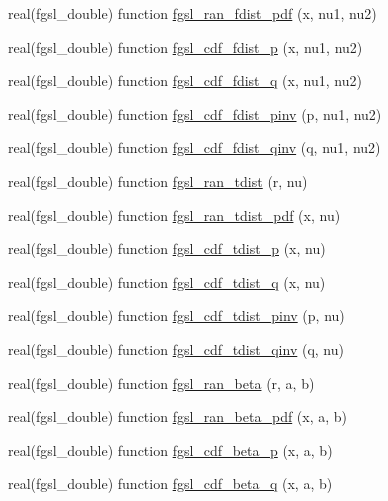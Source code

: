 \begin{DoxyCompactItemize}
\item 
real(fgsl\-\_\-double) function \hyperlink{rng_8finc_a752a7663a532c2765b796040098568e8}{fgsl\-\_\-ran\-\_\-fdist\-\_\-pdf} (x, nu1, nu2)
\item 
real(fgsl\-\_\-double) function \hyperlink{rng_8finc_a83d8d3cbe6899eadccd876c082e855b7}{fgsl\-\_\-cdf\-\_\-fdist\-\_\-p} (x, nu1, nu2)
\item 
real(fgsl\-\_\-double) function \hyperlink{rng_8finc_a8d5d5e89002d7fa3b09a8f0dcb223328}{fgsl\-\_\-cdf\-\_\-fdist\-\_\-q} (x, nu1, nu2)
\item 
real(fgsl\-\_\-double) function \hyperlink{rng_8finc_a5b0a774f2b2bfd4ff9a6b2bcba45e5b8}{fgsl\-\_\-cdf\-\_\-fdist\-\_\-pinv} (p, nu1, nu2)
\item 
real(fgsl\-\_\-double) function \hyperlink{rng_8finc_af6ee56a13f73d763ac76b58262768bbb}{fgsl\-\_\-cdf\-\_\-fdist\-\_\-qinv} (q, nu1, nu2)
\item 
real(fgsl\-\_\-double) function \hyperlink{rng_8finc_a588d0c7b571fa84a50e5bc06bd1c58e3}{fgsl\-\_\-ran\-\_\-tdist} (r, nu)
\item 
real(fgsl\-\_\-double) function \hyperlink{rng_8finc_adefcc6298f2b2b37d112870027638578}{fgsl\-\_\-ran\-\_\-tdist\-\_\-pdf} (x, nu)
\item 
real(fgsl\-\_\-double) function \hyperlink{rng_8finc_ace1197a0d3e0f71deda76ecc42b36dcf}{fgsl\-\_\-cdf\-\_\-tdist\-\_\-p} (x, nu)
\item 
real(fgsl\-\_\-double) function \hyperlink{rng_8finc_a4a1e3a8ce1487a5489502e2264c858c9}{fgsl\-\_\-cdf\-\_\-tdist\-\_\-q} (x, nu)
\item 
real(fgsl\-\_\-double) function \hyperlink{rng_8finc_a2473363fb7a8a2283461ae512996150f}{fgsl\-\_\-cdf\-\_\-tdist\-\_\-pinv} (p, nu)
\item 
real(fgsl\-\_\-double) function \hyperlink{rng_8finc_acd06e7e1635e1d1946e0891f0ddc8fa3}{fgsl\-\_\-cdf\-\_\-tdist\-\_\-qinv} (q, nu)
\item 
real(fgsl\-\_\-double) function \hyperlink{rng_8finc_a22e4189fd2ecd84ea6afdab388e7a1fb}{fgsl\-\_\-ran\-\_\-beta} (r, a, b)
\item 
real(fgsl\-\_\-double) function \hyperlink{rng_8finc_af65213d7b9b1dc033ba0b54876d577ed}{fgsl\-\_\-ran\-\_\-beta\-\_\-pdf} (x, a, b)
\item 
real(fgsl\-\_\-double) function \hyperlink{rng_8finc_a98571bac63e7448953ce6b83270fea54}{fgsl\-\_\-cdf\-\_\-beta\-\_\-p} (x, a, b)
\item 
real(fgsl\-\_\-double) function \hyperlink{rng_8finc_a1f77adb144c89fd15a5a9902b3fb0f0a}{fgsl\-\_\-cdf\-\_\-beta\-\_\-q} (x, a, b)

\end{DoxyCompactItemize}
